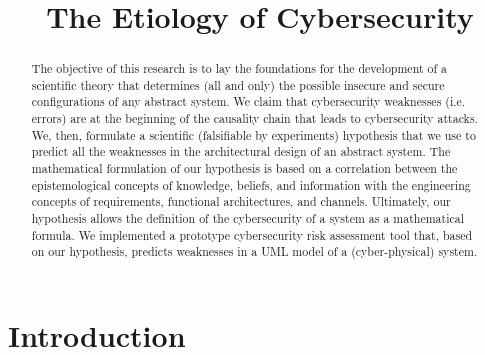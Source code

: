 \documentclass[conference]{IEEEtran}
\begin{document}
\title{The Etiology of Cybersecurity}

\author{
\and
{}
}

\maketitle

\begin{abstract}
	The objective of this research is to lay the foundations for the
	development of a scientific theory that determines (all and only) the possible
	insecure and secure configurations of any abstract system. We claim
	that cybersecurity weaknesses (i.e. errors) are at the beginning of the
	causality chain that leads to cybersecurity attacks.  We, then,
	formulate a scientific (falsifiable by experiments) hypothesis that we
	use to predict all the weaknesses in the architectural design of an
	abstract system. The mathematical formulation of our hypothesis is
	based on a correlation between the epistemological concepts of
	knowledge, beliefs, and information with the engineering concepts of
	requirements, functional architectures, and channels.  Ultimately, our
	hypothesis allows the definition of the cybersecurity of a system as a
	mathematical formula.  We implemented a prototype cybersecurity risk
	assessment tool that, based on our hypothesis, predicts weaknesses in a
	UML model of a (cyber-physical) system.
\end{abstract}

\IEEEpeerreviewmaketitle

\section{Introduction}\label{sec:intro}
\end{document}
